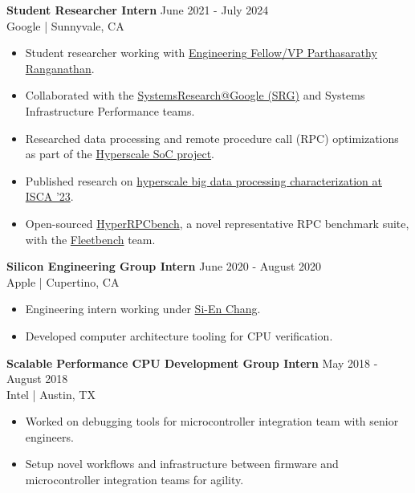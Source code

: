 \documentclass[line]{res}
\begin{document}
\begin{resume}
\textbf{Student Researcher Intern} \hfill June 2021 - July 2024
\\
Google | Sunnyvale, CA
\\
\vspace{-3mm}
\begin{itemize}
\item Student researcher working with \href{https://www.parthasarathys.com/}{Engineering Fellow/VP Parthasarathy Ranganathan}.
\item Collaborated with the \href{https://techsysinfra.google/research/}{SystemsResearch@Google (SRG)} and Systems Infrastructure Performance teams.
\item Researched data processing and remote procedure call (RPC) optimizations as part of the \hyperref[sec:hyperscale-soc]{Hyperscale SoC project}.
\item Published research on \hyperref[sec:iscapaper]{hyperscale big data processing characterization at ISCA '23}.
\item Open-sourced \href{https://github.com/google/fleetbench/tree/cd20746b68b307b148a761c676d6400f2541082d/fleetbench/rpc}{HyperRPCbench}, a novel representative RPC benchmark suite, with the \href{https://github.com/google/fleetbench}{Fleetbench} team.
\end{itemize}

\textbf{Silicon Engineering Group Intern} \hfill June 2020 - August 2020
\\
Apple | Cupertino, CA
\\
\vspace{-3mm}
\begin{itemize}
\item Engineering intern working under \href{https://www.linkedin.com/in/sienchang/}{Si-En Chang}.
\item Developed computer architecture tooling for CPU verification.
\end{itemize}

\textbf{Scalable Performance CPU Development Group Intern} \hfill May 2018 - August 2018
\\
Intel | Austin, TX
\\
\vspace{-3mm}
\begin{itemize}
\item Worked on debugging tools for microcontroller integration team with senior engineers.
\item Setup novel workflows and infrastructure between firmware and microcontroller integration teams for agility.
\end{itemize}


\end{resume}
\end{document}
